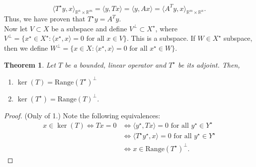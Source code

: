\documentclass[12pt]{article}
\newtheorem{theorem}{Theorem}
\newcommand{\R}{{\mathbb R}}
\newcommand{\la}{\langle}
\newcommand{\ra}{\rangle}
\newcommand{\sbs}{\subset}
\newcommand{\Xs}{X^{\star}}
\newcommand{\xst}{x^{\star}}
\newcommand{\Ts}{T^{\star}}
\newcommand{\Ys}{Y^{\star}}
\newcommand{\ys}{y^{\star}}
\newcommand{\Vp}{V^{\perp}}
\begin{document}
\[ \la \Ts y, x \ra_{\R^n \times \R^m} = \la y, Tx \ra = \la y, Ax \ra = \la A^{T} y, x \ra_{\R^m \times \R^n}.\]
Thus, we have proven that $\Ts y = A^{T} y$. \\
\indent Now let $V \sbs X$ be a subspace and define $V^{\perp} \sbs \Xs$, where $\Vp = \{ \xst \in \Xs : \la \xst, x \ra = 0 \text{ for all } x \in V \}$. This is a subspace. If $W \in \Xs$ subspace, then we define $W^{\perp}= \{ x \in X: \la \xst, x \ra = 0 \text{ for all } \xst \in W \}$. 
\begin{theorem}
Let $T$ be a bounded, linear operator and $\Ts$ be its adjoint. Then, 
\begin{enumerate}[topsep=-15pt]
\item $\ker(T) = \text{Range}(\Ts)^{\perp}$
\item $\ker(\Ts) = \text{Range}(T)^{\perp}$.
\end{enumerate}
\end{theorem}
\vspace{-25pt}
\begin{proof}(Only of 1.) Note the following equivalences:
\begin{align*}
x \in \ker(T) \Longleftrightarrow Tx = 0 & \Longleftrightarrow \la \ys, Tx \ra = 0 \text{ for all } \ys \in \Ys \\
& \Longleftrightarrow \la \Ts \ys, x \ra = 0 \text{ for all } \ys \in \Ys \\
& \Longleftrightarrow x \in \text{Range}(\Ts)^{\perp}.
\end{align*} 
\end{proof}
\vspace{-25pt}
\end{document}
